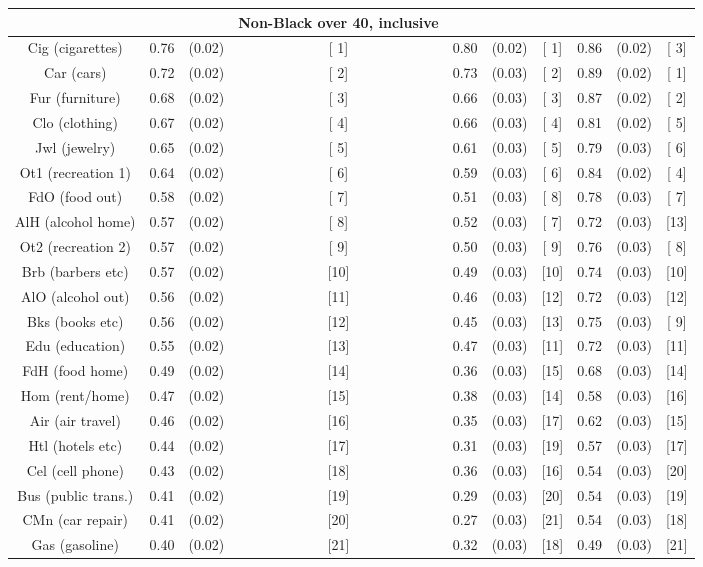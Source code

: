 \documentclass[a4paper,10pt]{article}
\begin{document}
\begin{tabular}{cccccccccc}
\hline \hline
 & & & \textbf{Non-Black over 40, inclusive} & & & & & \\
\hline
Cig (cigarettes)&0.76&(0.02)&[ 1] & 0.80&(0.02)&[ 1] & 0.86 & (0.02) & [ 3] \\
Car (cars)&0.72&(0.02)&[ 2] & 0.73&(0.03)&[ 2] & 0.89 & (0.02) & [ 1] \\
Fur (furniture)&0.68&(0.02)&[ 3] & 0.66&(0.03)&[ 3] & 0.87 & (0.02) & [ 2] \\
Clo (clothing)&0.67&(0.02)&[ 4] & 0.66&(0.03)&[ 4] & 0.81 & (0.02) & [ 5] \\
Jwl (jewelry)&0.65&(0.02)&[ 5] & 0.61&(0.03)&[ 5] & 0.79 & (0.03) & [ 6] \\
Ot1 (recreation 1)&0.64&(0.02)&[ 6] & 0.59&(0.03)&[ 6] & 0.84 & (0.02) & [ 4] \\
FdO (food out)&0.58&(0.02)&[ 7] & 0.51&(0.03)&[ 8] & 0.78 & (0.03) & [ 7] \\
AlH (alcohol home)&0.57&(0.02)&[ 8] & 0.52&(0.03)&[ 7] & 0.72 & (0.03) & [13] \\
Ot2 (recreation 2)&0.57&(0.02)&[ 9] & 0.50&(0.03)&[ 9] & 0.76 & (0.03) & [ 8] \\
Brb (barbers etc)&0.57&(0.02)&[10] & 0.49&(0.03)&[10] & 0.74 & (0.03) & [10] \\
AlO (alcohol out)&0.56&(0.02)&[11] & 0.46&(0.03)&[12] & 0.72 & (0.03) & [12] \\
Bks (books etc)&0.56&(0.02)&[12] & 0.45&(0.03)&[13] & 0.75 & (0.03) & [ 9] \\
Edu (education)&0.55&(0.02)&[13] & 0.47&(0.03)&[11] & 0.72 & (0.03) & [11] \\
FdH (food home)&0.49&(0.02)&[14] & 0.36&(0.03)&[15] & 0.68 & (0.03) & [14] \\
Hom (rent/home)&0.47&(0.02)&[15] & 0.38&(0.03)&[14] & 0.58 & (0.03) & [16] \\
Air (air travel)&0.46&(0.02)&[16] & 0.35&(0.03)&[17] & 0.62 & (0.03) & [15] \\
Htl (hotels etc)&0.44&(0.02)&[17] & 0.31&(0.03)&[19] & 0.57 & (0.03) & [17] \\
Cel (cell phone)&0.43&(0.02)&[18] & 0.36&(0.03)&[16] & 0.54 & (0.03) & [20] \\
Bus (public trans.)&0.41&(0.02)&[19] & 0.29&(0.03)&[20] & 0.54 & (0.03) & [19] \\
CMn (car repair)&0.41&(0.02)&[20] & 0.27&(0.03)&[21] & 0.54 & (0.03) & [18] \\
Gas (gasoline)&0.40&(0.02)&[21] & 0.32&(0.03)&[18] & 0.49 & (0.03) & [21] \\

\end{tabular}
\end{document}
